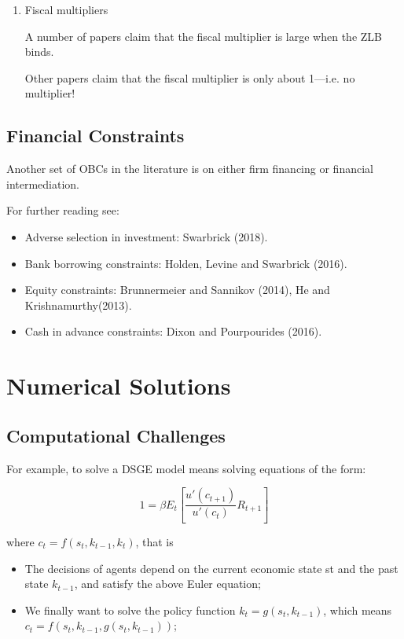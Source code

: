 \documentclass[10pt,math=newtx,citestyle=gb7714-2015,bibstyle=gb7714-2015]{elegantbook}
\begin{document}
{\begin{enumerate}
	\item Fiscal multipliers
	
	A number of papers claim that the fiscal multiplier is large when the ZLB binds.
	
	Other papers claim that the fiscal multiplier is only about 1---i.e. no multiplier!
\end{enumerate}

\subsection{Financial Constraints}

Another set of OBCs in the literature is on either firm financing or financial intermediation.

For further reading see:

\begin{itemize}
	\item Adverse selection in investment: Swarbrick (2018).
	\item Bank borrowing constraints: Holden, Levine and Swarbrick (2016).
	\item Equity constraints: Brunnermeier and Sannikov (2014), He and Krishnamurthy(2013).
	\item Cash in advance constraints: Dixon and Pourpourides (2016).
	
\end{itemize}

\section{Numerical Solutions}

\subsection{Computational Challenges}

For example, to solve a DSGE model means solving equations of the form:

$$1=\beta E_t\left[\frac{u'(c_{t+1})}{u'(c_t)}R_{t+1}\right]$$

where $c_t=f(s_t,k_{t-1},k_t)$, that is 
\begin{itemize}
	\item The decisions of agents depend on the current economic state st and the past state $k_{t-1}$, and satisfy the above Euler equation;
	
	\item We finally want to solve the policy function $k_t=g(s_t,k_{t-1})$, which means $c_t=f(s_t,k_{t-1},g(s_t,k_{t- 1}))$;
	

\end{itemize}}
\end{document}
